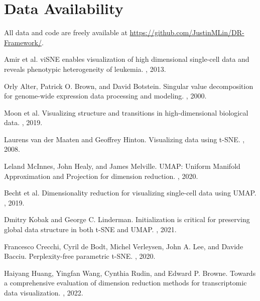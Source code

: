 \documentclass{article}
\begin{document}

\section{Data Availability}
All data and code are freely available at \url{https://github.com/JustinMLin/DR-Framework/}.




\begin{thebibliography}{10}

Amir et al.
\newblock viSNE enables visualization of high dimensional single-cell data and reveals phenotypic heterogeneity of leukemia.
, 2013.

Orly Alter, Patrick O. Brown, and David Botstein.
\newblock Singular value decomposition for genome-wide expression data processing and modeling.
, 2000.

Moon et al.
\newblock Visualizing structure and transitions in high-dimensional biological data.
, 2019.

Laurens van der Maaten and Geoffrey Hinton.
\newblock Visualizing data using t-SNE.
, 2008.

Leland McInnes, John Healy, and James Melville.
\newblock UMAP: Uniform Manifold Approximation and Projection for dimension reduction.
, 2020.

Becht et al.
\newblock Dimensionality reduction for visualizing single-cell data using UMAP.
, 2019.

Dmitry Kobak and George C. Linderman.
\newblock Initialization is critical for preserving global data structure in both t-SNE and UMAP.
, 2021.

Francesco Crecchi, Cyril de Bodt, Michel Verleysen, John A. Lee, and Davide Bacciu.
\newblock Perplexity-free parametric t-SNE.
, 2020.

Haiyang Huang, Yingfan Wang, Cynthia Rudin, and Edward P. Browne.
\newblock Towards a comprehensive evaluation of dimension reduction methods for transcriptomic data visualization.
, 2022.


\end{thebibliography}
\end{document}
